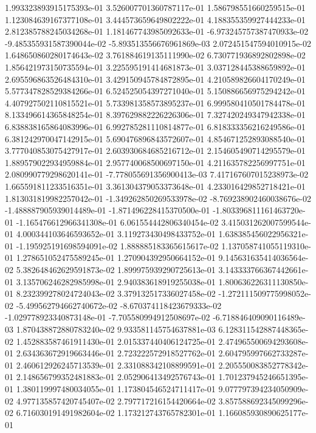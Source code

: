 1.993323893915175393e-01
3.526007701360787117e-01
1.586798551660259515e-01
1.123084639167377108e-01
3.444573659649802222e-01
4.188355359927444233e-01
2.812385788245034268e-01
1.181467743985092633e-01
-6.973245757387470933e-02
-9.485355931587390044e-02
-5.893513556676961869e-03
2.072451547594010915e-02
1.648650860280174643e-02
3.761884619135111990e-02
6.730771936892802898e-02
1.856421973150735594e-01
3.225595191414681873e-01
3.037128445388659892e-01
2.695596863526484310e-01
3.429150945784872895e-01
4.210589826604170249e-01
5.577347828529384266e-01
6.524525054397271040e-01
5.150886656975294242e-01
4.407927502110815521e-01
5.733981358573895237e-01
6.999580410501784478e-01
8.133496614365848254e-01
8.397629882226226306e-01
7.327420249347942338e-01
6.838838165864083996e-01
6.992785281110814877e-01
6.818333356216249586e-01
6.381242970047142915e-01
5.690476896843572607e-01
4.854671252893088540e-01
3.777040853075427917e-01
2.603930684685216712e-01
2.154605490714295579e-01
1.889579022934959884e-01
2.957740068500697150e-01
4.211635782256997751e-01
2.080990779298620141e-01
-7.778055691356900413e-03
7.417167607015238973e-02
1.665591811233516351e-01
3.361304379053373648e-01
4.233016429852718421e-01
1.813031819982257042e-01
-1.349262850269533978e-02
-8.769238902460038676e-02
-1.488887905939014489e-01
-1.871496228415370500e-01
-1.803396811161463720e-01
-1.165476612966341308e-01
6.061554442806340454e-02
3.415031262007599544e-01
4.000344103646593652e-01
3.119273430498433752e-01
1.638385456022956321e-01
-1.195925191698594091e-02
1.888885183365615617e-02
1.137058741055119310e-01
1.278651052475589245e-01
1.270904392950664152e-01
9.145631635414036564e-02
5.382648462629591873e-02
1.899975939290725613e-01
3.143333766367442661e-01
3.135706246282985998e-01
2.940383618919255038e-01
1.800636226311130850e-01
8.232399278024724043e-02
3.379132517336027458e-02
-1.272111509775998052e-02
-5.499562794662740672e-02
-8.670374118423679333e-02
-1.029778923340873148e-01
-7.705580994912508697e-02
-6.718846409090116489e-03
1.870438872880783240e-02
9.933581145754637881e-03
6.128311542887448365e-02
1.452883587461911430e-01
2.015337440406124725e-01
2.474965500694293608e-01
2.634363672919663446e-01
2.723222572918527762e-01
2.604795997662733287e-01
2.460612926245713539e-01
2.331088342108899591e-01
2.205550083852778342e-01
2.148656799352481883e-01
2.052906413492576743e-01
1.701237945246651395e-01
1.380119997480034055e-01
1.173804546524711417e-01
9.077797394234050909e-02
4.977135857420745407e-02
2.797717216154420664e-02
3.857588692345099296e-02
6.716030191491982604e-02
1.173212743765782301e-01
1.166085930890625177e-01
